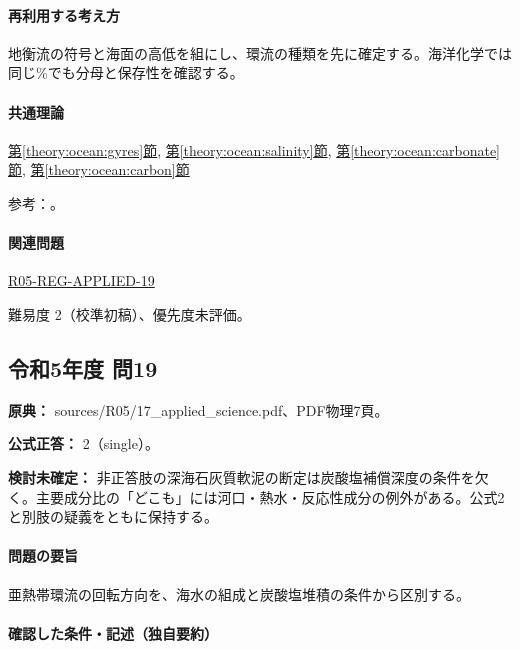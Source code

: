 \paragraph{再利用する考え方} 地衡流の符号と海面の高低を組にし、環流の種類を先に確定する。海洋化学では同じ\%でも分母と保存性を確認する。

\paragraph{共通理論} \hyperref[theory:ocean:gyres]{第\ref*{theory:ocean:gyres}節}, \hyperref[theory:ocean:salinity]{第\ref*{theory:ocean:salinity}節}, \hyperref[theory:ocean:carbonate]{第\ref*{theory:ocean:carbonate}節}, \hyperref[theory:ocean:carbon]{第\ref*{theory:ocean:carbon}節}

\par 参考：\cite{noaa_subtropical_ecco,noaa_sea_salt,feely_carbonate2004,noaa_carbon_chemistry,noaa_ccd_definition}。

\paragraph{関連問題} \hyperref[q:r05-reg-applied-19]{R05-REG-APPLIED-19}

\par 難易度 2（校準初稿）、優先度未評価。

\subsection{令和5年度 問19}
\label{q:r05-reg-applied-19}

\noindent\textbf{原典：} sources/R05/17\_applied\_science.pdf、PDF物理7頁。

\textbf{公式正答：} 2（single）。

\par\textbf{検討未確定：} 非正答肢の深海石灰質軟泥の断定は炭酸塩補償深度の条件を欠く。主要成分比の「どこも」には河口・熱水・反応性成分の例外がある。公式2と別肢の疑義をともに保持する。

\paragraph{問題の要旨} 亜熱帯環流の回転方向を、海水の組成と炭酸塩堆積の条件から区別する。

\paragraph{確認した条件・記述（独自要約）}\mbox{}\par

